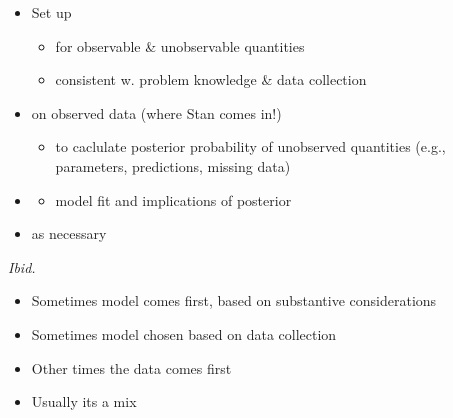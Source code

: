 \documentclass[10pt]{report}
\begin{document}
% 
\begin{itemize}
\item Set up 
  \vspace*{-4pt}
  \begin{itemize}
  \item for  observable \& unobservable quantities
  \item consistent w. problem knowledge \& data collection
  \end{itemize}
\item {} on observed data (where Stan comes in!)
  \vspace*{-4pt}
  \begin{itemize}
  \item to caclulate posterior probability of unobserved quantities
    (e.g., parameters, predictions, missing data)
  \end{itemize}
\item {}
  \vspace*{-4pt}
  \begin{itemize}
  \item model fit and implications of posterior
  \end{itemize}
\vfill
\item {} as necessary
\end{itemize}
\vfill\hfill {\footnotesize {\slshape Ibid.}}


%
\begin{itemize}
\item Sometimes model comes first, based on substantive
  considerations
\item Sometimes model chosen based on data collection
\item Other times the data comes first
\hfill
\item Usually its a mix
\end{itemize}
\end{document}
